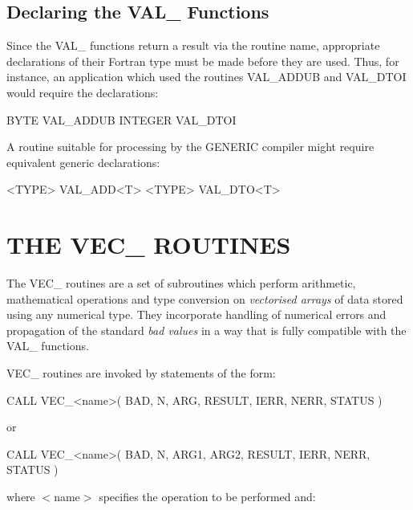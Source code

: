 \documentclass[11pt,nolof]{starlink}
\providecommand{\name}[1]{#1}
\begin{document}
\subsection{Declaring the \name{VAL\_} Functions}

Since the \name{VAL\_} functions return a result via the routine name,
appropriate declarations of their Fortran type must be made before they are
used.
Thus, for instance, an application which used the routines \name{VAL\_ADDUB}
and \name{VAL\_DTOI} would require the declarations:

\begin{terminalv}
BYTE VAL_ADDUB
INTEGER VAL_DTOI
\end{terminalv}

A routine suitable for processing by the \name{GENERIC} compiler might
require equivalent generic declarations:

\begin{terminalv}
<TYPE> VAL_ADD<T>
<TYPE> VAL_DTO<T>
\end{terminalv}

\section{THE \name{VEC\_} ROUTINES}

\label{section:vec}

The \name{VEC\_} routines are a set of subroutines which perform arithmetic,
mathematical operations and type conversion on \emph{vectorised arrays} of
data stored using any numerical type.
They incorporate handling of numerical errors and propagation of the
standard \emph{bad values} in a way that is fully compatible with the
\name{VAL\_} functions.

\name{VEC\_} routines are invoked by statements of the form:

\begin{terminalv}
CALL VEC_<name>( BAD, N, ARG, RESULT, IERR, NERR, STATUS )
\end{terminalv}
or
\begin{terminalv}
CALL VEC_<name>( BAD, N, ARG1, ARG2, RESULT, IERR, NERR, STATUS )
\end{terminalv}

where \name{$<$name$>$} specifies the operation to be performed and:
\end{document}
